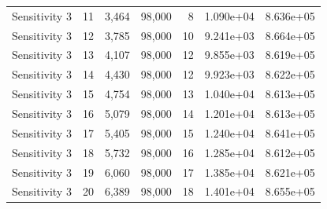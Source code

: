 \begin{table}[]
\begin{tabular}{lrrrrrr}
     Sensitivity 3 &   11 & 3,464 &             98,000 &                   8 & 1.090e+04 & 8.636e+05 \\
     Sensitivity 3 &   12 & 3,785 &             98,000 &                  10 & 9.241e+03 & 8.664e+05 \\
     Sensitivity 3 &   13 & 4,107 &             98,000 &                  12 & 9.855e+03 & 8.619e+05 \\
     Sensitivity 3 &   14 & 4,430 &             98,000 &                  12 & 9.923e+03 & 8.622e+05 \\
     Sensitivity 3 &   15 & 4,754 &             98,000 &                  13 & 1.040e+04 & 8.613e+05 \\
     Sensitivity 3 &   16 & 5,079 &             98,000 &                  14 & 1.201e+04 & 8.613e+05 \\
     Sensitivity 3 &   17 & 5,405 &             98,000 &                  15 & 1.240e+04 & 8.641e+05 \\
     Sensitivity 3 &   18 & 5,732 &             98,000 &                  16 & 1.285e+04 & 8.612e+05 \\
     Sensitivity 3 &   19 & 6,060 &             98,000 &                  17 & 1.385e+04 & 8.621e+05 \\
     Sensitivity 3 &   20 & 6,389 &             98,000 &                  18 & 1.401e+04 & 8.655e+05 \\
    \bottomrule
    \end{tabular}
    \label{tab:aadh_h_state_selection}
\end{table}

